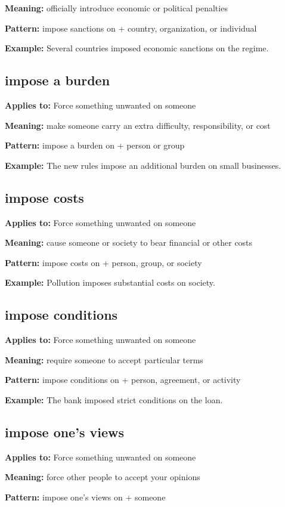\documentclass[11pt]{article}
\begin{document}
\textbf{Meaning:} officially introduce economic or political penalties

\textbf{Pattern:} impose sanctions on + country, organization, or individual

\textbf{Example:} Several countries imposed economic sanctions on the regime.

\subsection{impose a burden}
\textbf{Applies to:} Force something unwanted on someone

\textbf{Meaning:} make someone carry an extra difficulty, responsibility, or cost

\textbf{Pattern:} impose a burden on + person or group

\textbf{Example:} The new rules impose an additional burden on small businesses.

\subsection{impose costs}
\textbf{Applies to:} Force something unwanted on someone

\textbf{Meaning:} cause someone or society to bear financial or other costs

\textbf{Pattern:} impose costs on + person, group, or society

\textbf{Example:} Pollution imposes substantial costs on society.

\subsection{impose conditions}
\textbf{Applies to:} Force something unwanted on someone

\textbf{Meaning:} require someone to accept particular terms

\textbf{Pattern:} impose conditions on + person, agreement, or activity

\textbf{Example:} The bank imposed strict conditions on the loan.

\subsection{impose one's views}
\textbf{Applies to:} Force something unwanted on someone

\textbf{Meaning:} force other people to accept your opinions

\textbf{Pattern:} impose one's views on + someone
\end{document}
